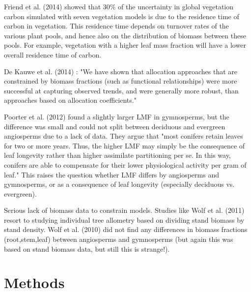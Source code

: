 \documentclass[a4paper]{article}
\begin{document}
Friend et al. (2014) showed that 30\% of the uncertainty in global vegetation carbon simulated with seven vegetation models is due to the residence time of carbon in vegetation. This residence time depends on turnover rates of the various plant pools, and hence also on the distribution of biomass between these pools. For example, vegetation with a higher leaf mass fraction will have a lower overall residence time of carbon.

De Kauwe et al. (2014) : "We have shown that allocation approaches that are constrained by biomass fractions (such as functional relationships) were more successful at capturing observed trends, and were generally more robust, than approaches based on allocation coefficients."

Poorter et al. (2012) found a slightly larger LMF in gymnosperms, but the difference was small and could not split between deciduous and evergreen angiosperms due to a lack of data. They argue that "most conifers retain leaves for two or more years. Thus, the higher LMF may simply be the consequence of leaf longevity rather than higher assimilate partitioning per se. In this way, conifers are able to compensate for their lower physiological activity per gram of leaf." This raises the question whether LMF differs by angiosperms and gymnosperms, or as a consequence of leaf longevity (especially deciduous vs. evergreen).

Serious lack of biomass data to constrain models. Studies like Wolf et al. (2011) resort to studying individual tree allometry based on dividing stand biomass by stand density. Wolf et al. (2010) did not find any differences in biomass fractions (root,stem,leaf) between angiosperms and gymnosperms (but again this was based on stand biomass data, but still this is strange!).


\section{Methods}
\end{document}
